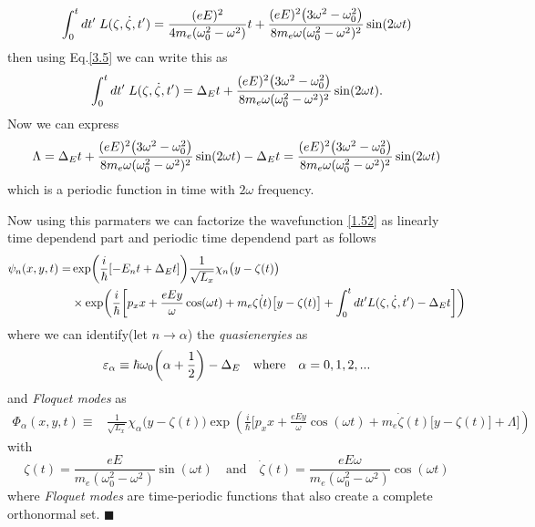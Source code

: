 \begin{equation} \label{3.10}
    \int_0^t dt' \; L(\zeta,\dot{\zeta},t')  =
    \frac{(eE)^2}{4m_e(\omega_0^2 - \omega^2)}t
    +
    \frac{(eE)^2\qty(3\omega^2 - \omega_0^2)}{8m_e\omega(\omega_0^2 - \omega^2)^2}
    \sin(2\omega t)
\end{equation}
then using Eq.\eqref{3.5} we can write this as
\begin{equation} \label{3.11}
    \int_0^t dt' \; L(\zeta,\dot{\zeta},t')  =
    \Delta_E t
    +
    \frac{(eE)^2\qty(3\omega^2 - \omega_0^2)}{8m_e\omega(\omega_0^2 - \omega^2)^2}
    \sin(2\omega t).
\end{equation}
Now we can express
\begin{equation} \label{3.12}
    \Lambda  =
    \Delta_E t
    +
    \frac{(eE)^2\qty(3\omega^2 - \omega_0^2)}{8m_e\omega(\omega_0^2 - \omega^2)^2}
    \sin(2\omega t) - \Delta_E t
    =
    \frac{(eE)^2\qty(3\omega^2 - \omega_0^2)}{8m_e\omega(\omega_0^2 - \omega^2)^2} \sin(2\omega t)
\end{equation}
which is a periodic function in time with $2\omega$ frequency.

\noindent
Now using this parmaters we can factorize the wavefunction \eqref{1.52} as linearly time dependend part and periodic time dependend part as follows
\begin{equation} \label{3.13}
  \begin{aligned}
    \psi_n(x,y,t)  = &
    \exp(\frac{i}{\hbar}\qty[-E_nt + \Delta_E t ])
    \frac{1}{\sqrt{L_x}} \chi_n\big(y - \zeta(t)\big)
    \\
    & \times
    \exp(
     \frac{i}{\hbar}\bigg[
     p_x x +
     \frac{eEy}{\omega}\cos(\omega t)+
     m_e\dot{\zeta(t)}\big[y-\zeta(t)\big]
     + \int_0^{t}dt'L(\zeta,\dot{\zeta},t') - \Delta_E t  \bigg])
  \end{aligned}
\end{equation}
where we can identify(let $n \rightarrow \alpha$) the \textit{quasienergies} as
\begin{equation} \label{3.14}
  \varepsilon_{\alpha} \equiv
  \hbar \omega_0\qty(\alpha + \frac{1}{2}) - \Delta_E \quad \text{where} \quad
  \alpha = 0,1,2, ...
\end{equation}
and \textit{Floquet modes} as
\begin{equation} \label{3.15}
  \begin{aligned}
    \Phi_{\alpha}(x,y,t) \equiv &
    \frac{1}{\sqrt{L_x}} \chi_{\alpha}\big(y - \zeta(t)\big)
    \exp(
     \frac{i}{\hbar}\bigg[
     p_x x +
     \frac{eEy}{\omega}\cos(\omega t)+
     m_e\dot{\zeta}(t)\big[y-\zeta(t)\big]
     + \Lambda \bigg])
  \end{aligned}
\end{equation}
with
\begin{equation} \label{3.16}
  \zeta(t) = \frac{eE}{m_e(\omega_0^2 - \omega^2)}\sin(\omega t) \quad \text{and} \quad
  \dot{\zeta}(t) = \frac{eE\omega}{m_e(\omega_0^2 - \omega^2)}\cos(\omega t)
\end{equation}
where  \textit{Floquet modes} are time-periodic functions that also create a complete orthonormal set.
\hfill$\blacksquare$

